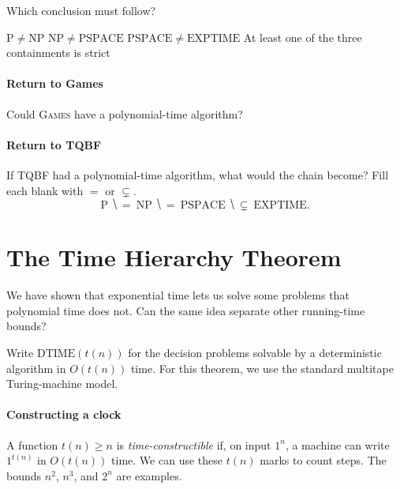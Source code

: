 \documentclass[11  pt]{article}
\begin{document}
\begin{Qu}
    Which conclusion must follow?
    \begin{itemize}
        \aitem $\mathrm{P}\neq\mathrm{NP}$
        \bitem $\mathrm{NP}\neq\mathrm{PSPACE}$
        \citem $\mathrm{PSPACE}\neq\mathrm{EXPTIME}$
        \ditem At least one of the three containments is strict
    \end{itemize}
\end{Qu}

\paragraph{Return to Games}
Could \textsc{Games} have a polynomial-time algorithm?
\vs{1.5cm}

\paragraph{Return to TQBF}
If \textsc{TQBF} had a polynomial-time algorithm, what would the chain become? Fill each blank with $=$ or $\subsetneq$.
\begin{equation*}
    \mathrm{P}\ \hide{=}\ \mathrm{NP}\ \hide{=}\ \mathrm{PSPACE}\ \hide{\subsetneq}\ \mathrm{EXPTIME}.
\end{equation*}
\vs{1cm}

\newpage
\section{The Time Hierarchy Theorem}
We have shown that exponential time lets us solve some problems that polynomial time does not. Can the same idea separate other running-time bounds?

Write $\mathrm{DTIME}(t(n))$ for the decision problems solvable by a deterministic algorithm in $O(t(n))$ time. For this theorem, we use the standard multitape Turing-machine model.

\paragraph{Constructing a clock}
A function $t(n)\geq n$ is \emph{time-constructible} if, on input $1^n$, a machine can write $1^{t(n)}$ in $O(t(n))$ time. We can use these $t(n)$ marks to count steps. The bounds $n^2$, $n^3$, and $2^n$ are examples.
\end{document}

